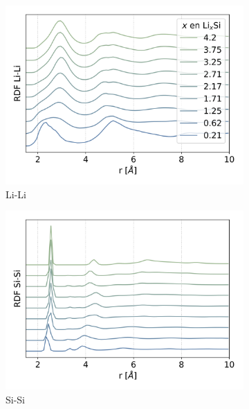 \begin{figure}[h!]
    \centering
    \begin{subfigure}{.475\textwidth}
        \centering
        \includegraphics[width=\textwidth]{Silicio/caracterizacion/resultados/rdf/rdf-LiLi.png}
        \caption{Li-Li}
        \label{fig:rdf-LiLi}
    \end{subfigure}
    \begin{subfigure}{.475\textwidth}
        \centering
        \includegraphics[width=\textwidth]{Silicio/caracterizacion/resultados/rdf/rdf-SiSi.png}
        \caption{Si-Si}
        \label{fig:rdf-SiSi}
    \end{subfigure}
    \begin{subfigure}{.475\textwidth}

\end{subfigure}
\end{figure}
